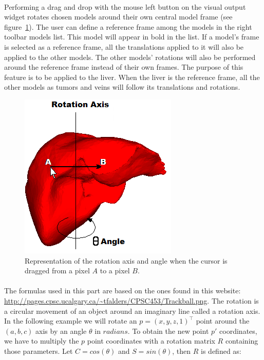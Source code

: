 \documentclass[12pt]{report}
\begin{document}
\paragraph{}
	Performing a drag and drop with the mouse left button on the visual output widget rotates chosen models around their own central model frame (see figure~\ref{rotation}). The user can define a reference frame among the models in the right toolbar models list. This model will appear in bold in the list. If a model's frame is selected as a reference frame, all the translations applied to it will also be applied to the other models. The other models' rotations will also be performed around the reference frame instead of their own frames. The purpose of this feature is to be applied to the liver. When the liver is the reference frame, all the other models as tumors and veins will follow its translations and rotations.

\begin{figure}[H]
\centerline{\includegraphics[scale = 1]{img/rotation.png}}
\caption{Representation of the rotation axis and angle when the cursor is dragged from a pixel $A$ to a pixel $B$.}
\label{rotation}
\end{figure}

\paragraph{}
	 The formulas used in this part are based on the ones found in this website: \url{http://pages.cpsc.ucalgary.ca/~tfalders/CPSC453/Trackball.png}. The rotation is a circular movement of an object around an imaginary line called a rotation axis. In the following example we will rotate an $p=(x, y, z, 1)^\top$ point around the $(a, b, c)$ axis by an angle $\theta$ in $radians$. To obtain the new point $p'$ coordinates, we have to multiply the $p$ point coordinates with a rotation matrix $R$ containing those parameters. Let $C = cos(\theta)$ and $S = sin(\theta)$, then $R$ is defined as:
\end{document}
